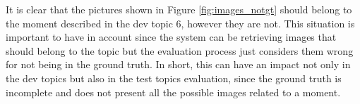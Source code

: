     It is clear that the pictures shown in Figure \ref{fig:images_notgt} should belong to the moment described in the dev topic 6, however they are not.  This situation is important to have in account since the system can be retrieving images that should belong to the topic but the evaluation process just considers them wrong for not being in the ground truth. In short, this can have an impact not only in the dev topics but also in the test topics evaluation, since the ground truth is incomplete and does not present all the possible images related to a moment.
